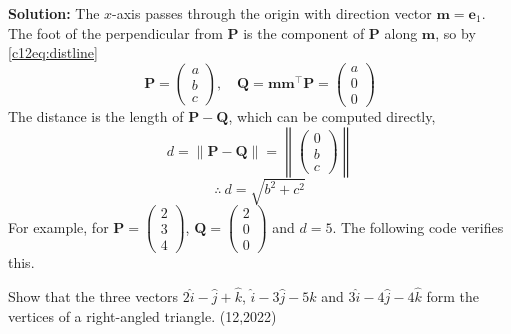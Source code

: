 \textbf{Solution:} The $x$-axis passes through the origin with direction vector $\mathbf{m} = \mathbf{e}_1$. The foot of the perpendicular from $\mathbf{P}$ is the component of $\mathbf{P}$ along $\mathbf{m}$, so by \eqref{c12eq:distline}
\begin{equation}
\mathbf{P} = \begin{pmatrix} a \\ b \\ c \end{pmatrix}, \quad
\mathbf{Q} = \mathbf{m}\mathbf{m}^{\top}\mathbf{P} = \begin{pmatrix} a \\ 0 \\ 0 \end{pmatrix}
\end{equation}
The distance is the length of $\mathbf{P}-\mathbf{Q}$, which can be computed directly,
\begin{equation}
d = \|\mathbf{P}-\mathbf{Q}\| = \left\| \begin{pmatrix} 0 \\ b \\ c \end{pmatrix} \right\|
\end{equation}
\begin{equation}
\therefore\ d = \sqrt{b^2 + c^2}
\end{equation}
For example, for $\mathbf{P} = \begin{pmatrix} 2 \\ 3 \\ 4 \end{pmatrix}$, $\mathbf{Q} = \begin{pmatrix} 2 \\ 0 \\ 0 \end{pmatrix}$ and $d = 5$. The following code verifies this.

\nopagebreak[4]
\begin{center}
\end{center}


\clearpage
\item Show that the three vectors $2\hat{i} - \hat{j} + \hat{k}$, $\hat{i} - 3\hat{j} - 5\hat{k}$ and $3\hat{i} - 4\hat{j} - 4\hat{k}$ form the vertices of a right-angled triangle. \hfill (12,2022)

